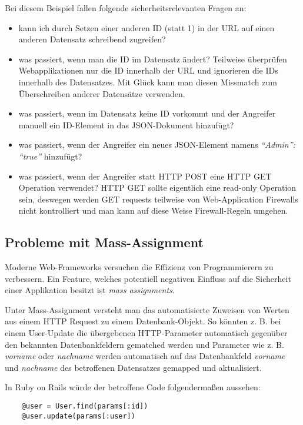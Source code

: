 Bei diesem Beispiel fallen folgende sicherheitsrelevanten Fragen an:

\begin{itemize}
	\item kann ich durch Setzen einer anderen ID (statt 1) in der URL auf einen anderen Datensatz schreibend zugreifen?
	\item was passiert, wenn man die ID im Datensatz ändert? Teilweise überprüfen Webapplikationen nur die ID innerhalb der URL und ignorieren die IDs innerhalb des Datensatzes. Mit Glück kann man diesen Missmatch zum Überschreiben anderer Datensätze verwenden.
	\item was passiert, wenn im Datensatz keine ID vorkommt und der Angreifer manuell ein ID-Element in das JSON-Dokument hinzufügt?
	\item was passiert, wenn der Angreifer ein neues JSON-Element namens \textit{``Admin'': ``true''} hinzufügt?
	\item was passiert, wenn der Angreifer statt HTTP POST eine HTTP GET Operation verwendet? HTTP GET sollte eigentlich eine read-only Operation sein, deswegen werden GET requests teilweise von Web-Application Firewalls nicht kontrolliert und man kann auf diese Weise Firewall-Regeln umgehen.
\end{itemize}

\subsection{Probleme mit Mass-Assignment}

Moderne Web-Frameworks versuchen die Effizienz von Programmierern zu verbessern. Ein Feature, welches potentiell negativen Einfluss auf die Sicherheit einer Applikation besitzt ist \textit{mass assignments}.

Unter Mass-Assignment versteht man das automatisierte Zuweisen von Werten aus einem HTTP Request zu einem Datenbank-Objekt. So könnten z. B. bei einem User-Update die übergebenen HTTP-Parameter automatisch gegenüber den bekannten Datenbankfeldern gematched werden und Parameter wie z. B. \textit{vorname} oder \textit{nachname} werden automatisch auf das Datenbankfeld \textit{vorname} und \textit{nachname} des betroffenen Datensatzes gemapped und aktualisiert.

In Ruby on Rails würde der betroffene Code folgendermaßen aussehen:

\begin{verbatim}
	@user = User.find(params[:id])
	@user.update(params[:user])
\end{verbatim}


